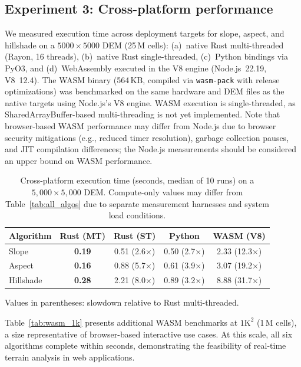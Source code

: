 \documentclass[preprint,review,12pt,authoryear]{elsarticle}
\begin{document}
\subsection{Experiment 3: Cross-platform performance}
\label{subsec:crossplatform}

We measured execution time across deployment targets for slope, aspect, and hillshade on a $5000 \times 5000$ DEM (25\,M cells): (a)~native Rust multi-threaded (Rayon, 16 threads), (b)~native Rust single-threaded, (c)~Python bindings via PyO3, and (d)~WebAssembly executed in the V8 engine (Node.js~22.19, V8~12.4). The WASM binary (564\,KB, compiled via \texttt{wasm-pack} with release optimizations) was benchmarked on the same hardware and DEM files as the native targets using Node.js's V8 engine. WASM execution is single-threaded, as SharedArrayBuffer-based multi-threading is not yet implemented. Note that browser-based WASM performance may differ from Node.js due to browser security mitigations (e.g., reduced timer resolution), garbage collection pauses, and JIT compilation differences; the Node.js measurements should be considered an upper bound on WASM performance.

\begin{table}[htbp]
\centering
\caption{Cross-platform execution time (seconds, median of 10 runs) on a $5{,}000 \times 5{,}000$ DEM. Compute-only values may differ from Table~\ref{tab:all_algos} due to separate measurement harnesses and system load conditions.}
\label{tab:crossplatform}
\begin{tabular}{@{}lcccc@{}}
\toprule
Algorithm & Rust (MT) & Rust (ST) & Python & WASM (V8) \\
\midrule
Slope     & \textbf{0.19} & 0.51 (2.6$\times$) & 0.50 (2.7$\times$) & 2.33 (12.3$\times$) \\
Aspect    & \textbf{0.16} & 0.88 (5.7$\times$) & 0.61 (3.9$\times$) & 3.07 (19.2$\times$) \\
Hillshade & \textbf{0.28} & 2.21 (8.0$\times$) & 0.89 (3.2$\times$) & 8.88 (31.7$\times$) \\
\bottomrule
\end{tabular}
\smallskip

{\footnotesize Values in parentheses: slowdown relative to Rust multi-threaded.}
\end{table}

Table~\ref{tab:wasm_1k} presents additional WASM benchmarks at $1\text{K}^2$ (1\,M cells), a size representative of browser-based interactive use cases. At this scale, all six algorithms complete within seconds, demonstrating the feasibility of real-time terrain analysis in web applications.
\end{document}
